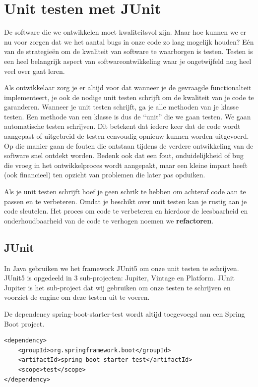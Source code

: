 \chapter{Unit testen met JUnit}

De software die we ontwikkelen moet kwaliteitsvol zijn. Maar hoe kunnen we er nu voor zorgen dat we het aantal bugs in onze code zo laag mogelijk houden? E\'en van de strategie\"en om de kwaliteit van software te waarborgen is testen. Testen is een heel belangrijk aspect van softwareontwikkeling waar je ongetwijfeld nog heel veel over gaat leren. 

Als ontwikkelaar zorg je er altijd voor dat wanneer je de gevraagde functionalteit implementeert, je ook de nodige unit testen schrijft om de kwaliteit van je code te garanderen. Wanneer je unit testen schrijft, ga je alle methoden van je klasse testen. Een methode van een klasse is dus de ``unit'' die we gaan testen.
We gaan automatische testen schrijven. Dit betekent dat iedere keer dat de code wordt aangepast of uitgebreid de testen eenvoudig opnieuw kunnen worden uitgevoerd. Op die manier gaan de fouten die ontstaan tijdens de verdere ontwikkeling van de software snel ontdekt worden. Bedenk ook dat een fout, onduidelijkheid of bug die vroeg in het ontwikkelproces wordt aangepakt, maar een kleine impact heeft (ook financieel) ten opzicht van problemen die later pas opduiken.

Als je unit testen schrijft hoef je geen schrik te hebben om achteraf code aan te passen en te verbeteren. Omdat je beschikt over unit testen kan je rustig aan je code sleutelen. Het proces om code te verbeteren en hierdoor de leesbaarheid en onderhoudbaarheid van de code te verhogen noemen we \textbf{refactoren}. 

\section{JUnit}

In Java gebruiken we het framework JUnit5 om onze unit testen te schrijven.
JUnit5 is opgedeeld in 3 sub-projecten:  Jupiter, Vintage en Platform. JUnit Jupiter is het  sub-project dat wij gebruiken om onze testen te schrijven en voorziet de engine om deze testen uit te voeren.

De dependency  spring-boot-starter-test wordt altijd toegevoegd aan een Spring Boot project. 

\begin{verbatim}
<dependency>
	<groupId>org.springframework.boot</groupId>
	<artifactId>spring-boot-starter-test</artifactId>
	<scope>test</scope>
</dependency>
\end{verbatim}

